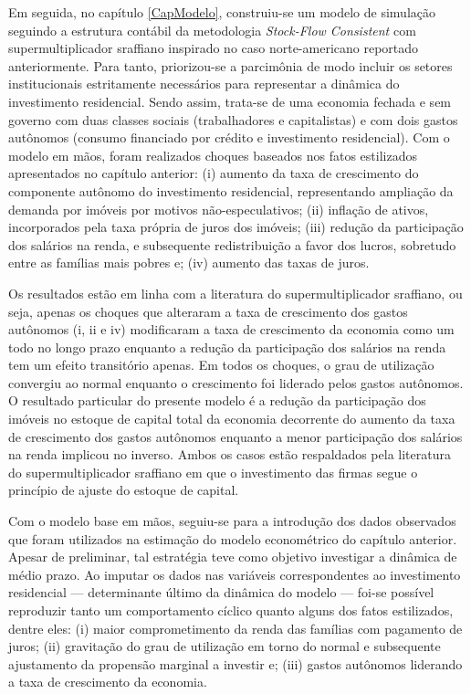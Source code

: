 Em seguida, no capítulo \ref{CapModelo}, construiu-se um modelo de simulação seguindo a estrutura contábil da metodologia \textit{Stock-Flow Consistent} com supermultiplicador sraffiano inspirado no caso norte-americano reportado anteriormente.
Para tanto, priorizou-se a parcimônia de modo incluir os setores institucionais estritamente necessários para representar a dinâmica do investimento residencial.
Sendo assim, trata-se de uma economia fechada e sem governo com duas classes sociais (trabalhadores e capitalistas) e com dois gastos autônomos (consumo financiado por crédito e investimento residencial).
Com o modelo em mãos, foram realizados choques baseados nos fatos estilizados apresentados no capítulo anterior: (i) aumento da taxa de crescimento do componente autônomo do investimento residencial, representando ampliação da demanda por imóveis por motivos não-especulativos; (ii) inflação de ativos, incorporados pela taxa própria de juros dos imóveis; (iii) redução da participação dos salários na renda, e subsequente redistribuição a favor dos lucros, sobretudo entre as famílias mais pobres e; (iv) aumento das taxas de juros.


Os resultados estão em linha com a literatura do supermultiplicador sraffiano, ou seja, apenas os choques que alteraram a taxa de crescimento dos gastos autônomos (i, ii e iv) modificaram a taxa de crescimento da economia como um todo no longo prazo enquanto a redução da participação dos salários na renda tem um efeito transitório apenas.
Em todos os choques, o grau de utilização convergiu ao normal enquanto o crescimento foi liderado pelos gastos autônomos.
O resultado particular do presente modelo é a redução da participação dos imóveis no estoque de capital total da economia decorrente do aumento da taxa de crescimento dos gastos autônomos enquanto a menor participação dos salários na renda implicou no inverso.
Ambos os casos estão respaldados pela literatura do supermultiplicador sraffiano em que o investimento das firmas segue o princípio de ajuste do estoque de capital.


Com o modelo base em mãos, seguiu-se para a introdução dos dados observados que foram utilizados na estimação do modelo econométrico do capítulo anterior.
Apesar de preliminar, tal estratégia teve como objetivo investigar a dinâmica de médio prazo.
Ao imputar os dados nas variáveis correspondentes ao investimento residencial --- determinante último da dinâmica do modelo --- foi-se possível reproduzir tanto um comportamento cíclico quanto alguns dos fatos estilizados, dentre eles: (i) maior comprometimento da renda das famílias com pagamento de juros; (ii) gravitação do grau de utilização em torno do normal e subsequente ajustamento da propensão marginal a investir e; (iii) gastos autônomos liderando a taxa de crescimento da economia.

